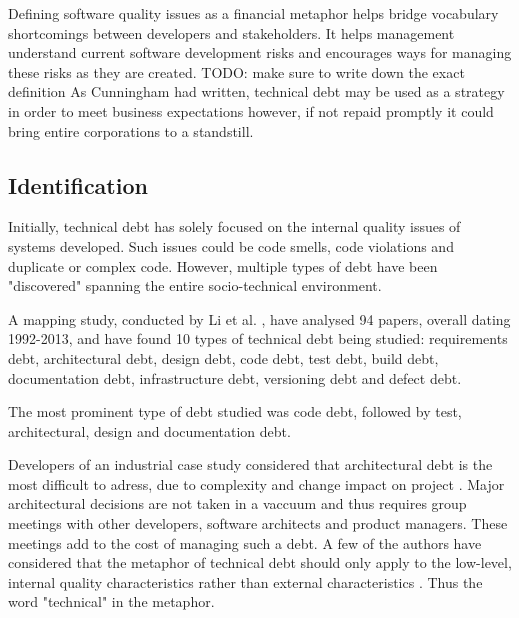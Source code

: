 \documentclass{mprop}
\begin{document}
Defining software quality issues as a financial metaphor helps bridge vocabulary shortcomings between developers and stakeholders.
It helps management understand current software development risks and encourages ways for managing these risks as they are created.
TODO: make sure to write down the exact definition
As Cunningham \cite{Cunningham1993} had written, technical debt may be used as a strategy in order to meet business expectations however, if not repaid promptly it could bring entire corporations to a standstill.

\subsection{Identification}

Initially, technical debt has solely focused on the internal quality issues of systems developed.
Such issues could be code smells, code violations and duplicate or complex code.
However, multiple types of debt have been "discovered" spanning the entire socio-technical environment.

A mapping study, conducted by Li et al. \cite{Li2015}, have analysed 94 papers, overall dating 1992-2013, and have found 10 types of technical debt being studied:
requirements debt,
architectural debt,
design debt,
code debt,
test debt,
build debt,
documentation debt,
infrastructure debt,
versioning debt
and defect debt.

The most prominent type of debt studied was code debt, followed by test, architectural, design and documentation debt.

Developers of an industrial case study considered that architectural debt is the most difficult to adress, due to complexity and change impact on project \cite{Codabux2013}. 
Major architectural decisions are not taken in a vaccuum and thus requires group meetings with other developers, software architects and product managers.
These meetings add to the cost of managing such a debt.
A few of the authors have considered that the metaphor of technical debt should only apply to the low-level, internal quality characteristics rather than external characteristics \cite{Theodoropoulos2011} \cite{Nugroho2011}.
Thus the word "technical" in the metaphor.
\end{document}
